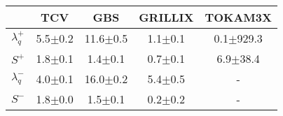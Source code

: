 \begin{tabular}{lcccc}
\toprule
{} &          TCV &           GBS &      GRILLIX &        TOKAM3X \\
\midrule
$\lambda_{q}^{+}$ &  5.5$\pm$0.2 &  11.6$\pm$0.5 &  1.1$\pm$0.1 &  0.1$\pm$929.3 \\
$S^{+}$           &  1.8$\pm$0.1 &   1.4$\pm$0.1 &  0.7$\pm$0.1 &   6.9$\pm$38.4 \\
$\lambda_{q}^{-}$ &  4.0$\pm$0.1 &  16.0$\pm$0.2 &  5.4$\pm$0.5 &              - \\
$S^{-}$           &  1.8$\pm$0.0 &   1.5$\pm$0.1 &  0.2$\pm$0.2 &              - \\
\bottomrule
\end{tabular}
